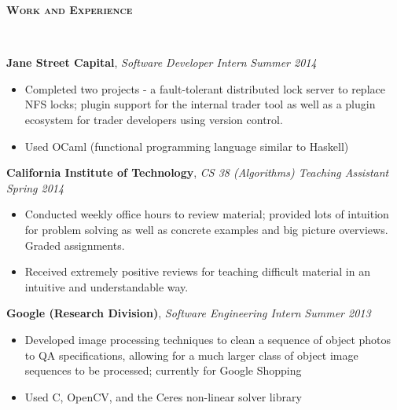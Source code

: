 \documentclass{article}
\newenvironment{changemargin}[2]{%
  \begin{list}{}{%
    \setlength{\topsep}{0pt}%
    \setlength{\leftmargin}{#1}%
    \setlength{\rightmargin}{#2}%
    \setlength{\listparindent}{\parindent}%
    \setlength{\itemindent}{\parindent}%
    \setlength{\parsep}{\parskip}%
  }%
  \item[]}{\end{list}
}
\newcommand{\lineover}{
	\begin{changemargin}{-0.05in}{-0.05in}
		\vspace*{-8pt}
		\hrulefill \\
		\vspace*{-2pt}
	\end{changemargin}
}
\newcommand{\header}[1]{
	\begin{changemargin}{-0.5in}{-0.5in}
		{\large \textbf{\scshape{#1}}}\\
  	\lineover
	\end{changemargin}
}
\newenvironment{body} {
	\vspace*{-16pt}
	\begin{changemargin}{-0.25in}{-0.5in}
  }	
	{\end{changemargin}
}
\newcommand{\CC}{C\nolinebreak\hspace{-.05em}\raisebox{.4ex}{\tiny\bf +}\nolinebreak\hspace{-.10em}\raisebox{.4ex}{\tiny\bf +}}
\begin{document}
\smallskip


\header{Work and Experience}

\begin{body}
	\vspace{14pt}
	\textbf{Jane Street Capital}, \emph{Software Developer Intern} \hfill \emph{Summer 2014}\\
	\vspace*{-4pt}
	\begin{itemize}
		\item Completed two projects - a fault-tolerant distributed lock server to replace NFS locks; plugin support for the internal trader tool as well as a plugin ecosystem for trader developers using version control.
		\item Used OCaml (functional programming language similar to Haskell)
	\end{itemize}

	\medskip

	\textbf{California Institute of Technology}, \emph{CS 38 (Algorithms) Teaching Assistant} \hfill \emph{Spring 2014}\\
	\vspace*{-4pt}
	\begin{itemize}
		\item Conducted weekly office hours to review material; provided lots of intuition for problem solving as well as concrete examples and big picture overviews. Graded assignments. 
		\item Received extremely positive reviews for teaching difficult material in an intuitive and understandable way.
	\end{itemize}

	\medskip

	\textbf{Google (Research Division)}, \emph{Software Engineering Intern} \hfill \emph{Summer 2013}\\
	\vspace*{-4pt}
	\begin{itemize}
		\item Developed image processing techniques to clean a sequence of object photos to QA specifications, allowing for a much larger class of object image sequences to be processed; currently for Google Shopping
		\item Used \CC, OpenCV, and the Ceres non-linear solver library
	\end{itemize}

	\medskip


\end{body}
\end{document}
